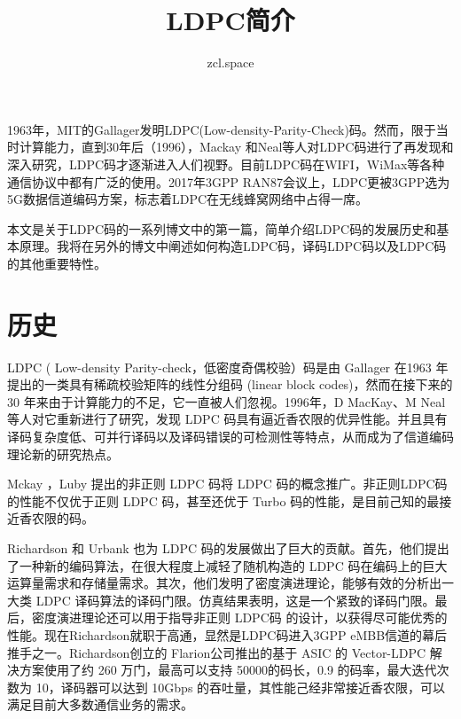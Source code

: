 \documentclass[10pt,a4paper,UTF8]{article}
\author{zcl.space}
\date{}
\title{LDPC简介}
\begin{document}
\maketitle
\tableofcontents
{}
1963年，MIT的Gallager发明LDPC(Low-density-Parity-Check)码。然而，限于当时计算能力，直到30年后（1996），Mackay 和Neal等人对LDPC码进行了再发现和深入研究，LDPC码才逐渐进入人们视野。目前LDPC码在WIFI，WiMax等各种通信协议中都有广泛的使用。2017年3GPP RAN87会议上，LDPC更被3GPP选为5G数据信道编码方案，标志着LDPC在无线蜂窝网络中占得一席。

本文是关于LDPC码的一系列博文中的第一篇，简单介绍LDPC码的发展历史和基本原理。我将在另外的博文中阐述如何构造LDPC码，译码LDPC码以及LDPC码的其他重要特性。


\section{历史}
\label{sec:org7649099}


LDPC ( Low-density Parity-check，低密度奇偶校验）码是由 Gallager 在1963 年提出的一类具有稀疏校验矩阵的线性分组码 (linear block codes)，然而在接下来的 30 年来由于计算能力的不足，它一直被人们忽视。1996年，D MacKay、M Neal 等人对它重新进行了研究，发现 LDPC 码具有逼近香农限的优异性能。并且具有译码复杂度低、可并行译码以及译码错误的可检测性等特点，从而成为了信道编码理论新的研究热点。

Mckay ，Luby 提出的非正则 LDPC 码将 LDPC 码的概念推广。非正则LDPC码 的性能不仅优于正则 LDPC 码，甚至还优于 Turbo 码的性能，是目前己知的最接近香农限的码。

Richardson 和 Urbank 也为 LDPC 码的发展做出了巨大的贡献。首先，他们提出了一种新的编码算法，在很大程度上减轻了随机构造的 LDPC 码在编码上的巨大运算量需求和存储量需求。其次，他们发明了密度演进理论，能够有效的分析出一大类 LDPC 译码算法的译码门限。仿真结果表明，这是一个紧致的译码门限。最后，密度演进理论还可以用于指导非正则 LDPC码 的设计，以获得尽可能优秀的性能。现在Richardson就职于高通，显然是LDPC码进入3GPP eMBB信道的幕后推手之一。Richardson创立的 Flarion公司推出的基于 ASIC 的 Vector-LDPC 解决方案使用了约 260 万门，最高可以支持 50000的码长，0.9 的码率，最大迭代次数为 10，译码器可以达到 10Gbps 的吞吐量，其性能己经非常接近香农限，可以满足目前大多数通信业务的需求。
\end{document}
